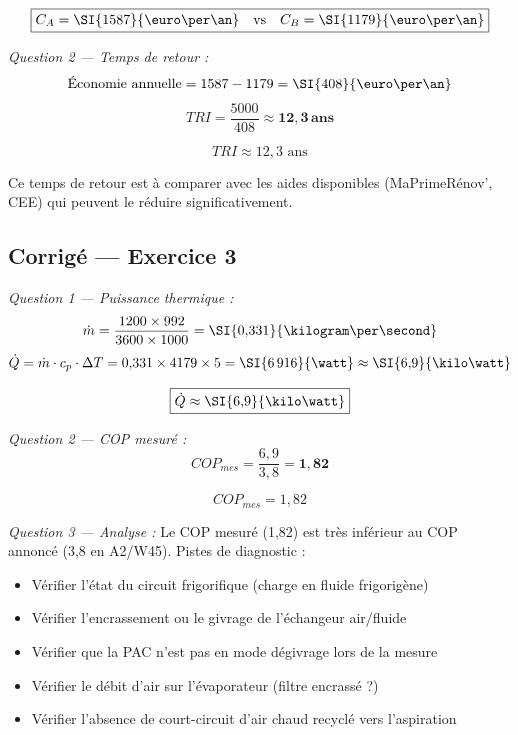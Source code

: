\[
  \boxed{C_A = \SI{1587}{\euro\per\an} \quad \text{vs} \quad C_B = \SI{1179}{\euro\per\an}}
\]

\textit{Question 2 — Temps de retour :}
\[
  \text{Économie annuelle} = 1587 - 1179 = \SI{408}{\euro\per\an}
\]
\[
  TRI = \frac{5000}{408} \approx \mathbf{12{,}3\,\text{ans}}
\]

\[
  \boxed{TRI \approx 12{,}3 \text{ ans}}
\]

\begin{attention}
Ce temps de retour est à comparer avec les aides disponibles (MaPrimeRénov', CEE) qui peuvent le réduire significativement.
\end{attention}


\subsection*{Corrigé — Exercice 3}

\textit{Question 1 — Puissance thermique :}
\[
  \dot{m} = \frac{1200 \times 992}{3600 \times 1000} = \SI{0{,}331}{\kilogram\per\second}
\]
\[
  \dot{Q} = \dot{m} \cdot c_p \cdot \Delta T = 0{,}331 \times 4179 \times 5 = \SI{6\,916}{\watt} \approx \SI{6{,}9}{\kilo\watt}
\]

\[
  \boxed{\dot{Q} \approx \SI{6{,}9}{\kilo\watt}}
\]

\textit{Question 2 — COP mesuré :}
\[
  COP_{mes} = \frac{6{,}9}{3{,}8} = \mathbf{1{,}82}
\]

\[
  \boxed{COP_{mes} = 1{,}82}
\]

\textit{Question 3 — Analyse :} Le COP mesuré (1,82) est très inférieur au COP annoncé (3,8 en A2/W45). Pistes de diagnostic :
\begin{itemize}
  \item Vérifier l'état du circuit frigorifique (charge en fluide frigorigène)
  \item Vérifier l'encrassement ou le givrage de l'échangeur air/fluide
  \item Vérifier que la PAC n'est pas en mode dégivrage lors de la mesure
  \item Vérifier le débit d'air sur l'évaporateur (filtre encrassé ?)
  \item Vérifier l'absence de court-circuit d'air chaud recyclé vers l'aspiration
\end{itemize}



